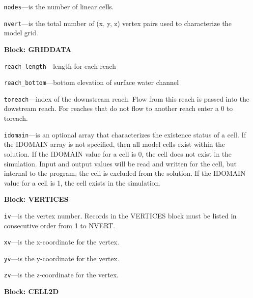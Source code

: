 \begin{description}
\item \texttt{nodes}---is the number of linear cells.

\item \texttt{nvert}---is the total number of (x, y, z) vertex pairs used to characterize the model grid.

\end{description}
\item \textbf{Block: GRIDDATA}

\begin{description}
\item \texttt{reach\_length}---length for each reach

\item \texttt{reach\_bottom}---bottom elevation of surface water channel

\item \texttt{toreach}---index of the downstream reach.  Flow from this reach is passed into the dowstream reach.  For reaches that do not flow to another reach enter a 0 to toreach.

\item \texttt{idomain}---is an optional array that characterizes the existence status of a cell.  If the IDOMAIN array is not specified, then all model cells exist within the solution.  If the IDOMAIN value for a cell is 0, the cell does not exist in the simulation.  Input and output values will be read and written for the cell, but internal to the program, the cell is excluded from the solution.  If the IDOMAIN value for a cell is 1, the cell exists in the simulation.

\end{description}
\item \textbf{Block: VERTICES}

\begin{description}
\item \texttt{iv}---is the vertex number.  Records in the VERTICES block must be listed in consecutive order from 1 to NVERT.

\item \texttt{xv}---is the x-coordinate for the vertex.

\item \texttt{yv}---is the y-coordinate for the vertex.

\item \texttt{zv}---is the z-coordinate for the vertex.

\end{description}
\item \textbf{Block: CELL2D}

